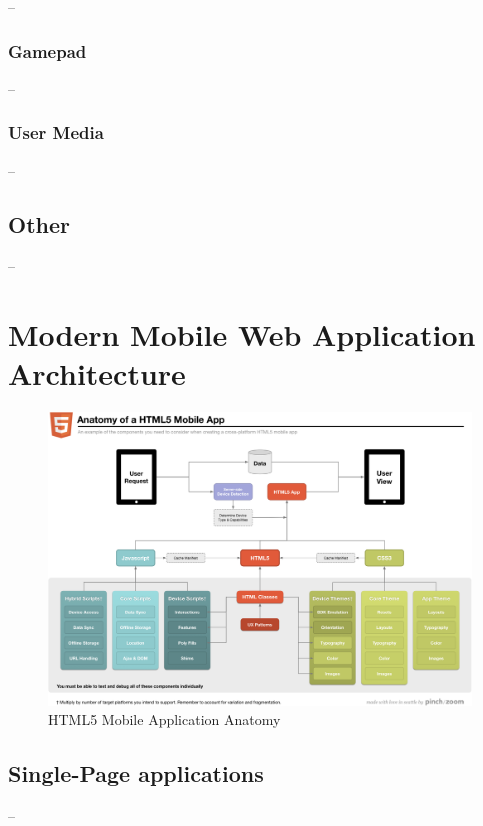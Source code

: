 --

\subsubsection{Gamepad}

--

\subsubsection{User Media}

--

\subsection{Other}

--

\section{Modern Mobile Web Application Architecture}
\label{section:modern-mobile-web}

\begin{figure}[ht]
  \includegraphics[width=\textwidth]{images/anatomy-of-a-html5-mobile-app.png}
  \caption{HTML5 Mobile Application Anatomy \citationneeded}
  \label{figure:anatomy-of-a-html5-mobile-app.png}
\end{figure}

\subsection{Single-Page applications}

--

